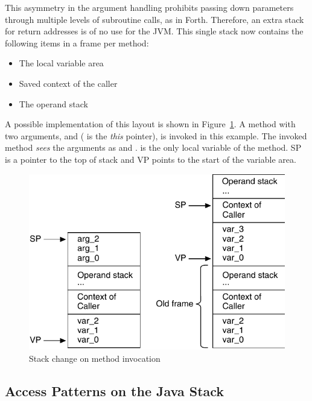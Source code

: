 This asymmetry in the argument handling prohibits passing down
parameters through multiple levels of subroutine calls, as in Forth.
Therefore, an extra stack for return addresses is of no use for the
JVM. This single stack now contains the following items in a frame
per method:
%
\begin{itemize}
\item The local variable area
\item Saved context of the caller
\item The operand stack
\end{itemize}
%
A possible implementation of this layout is shown in
Figure~\ref{fig_stack_invoke}. A method with two arguments,
 and  ( is the
\emph{this} pointer), is invoked in this example. The invoked method
\emph{sees} the arguments as  and .
 is the only local variable of the method. SP is a
pointer to the top of stack and VP points to the start of the
variable area.

\begin{figure}
    \centering
    \includegraphics[scale=\picscale]{stack/stack_invocation}
    \caption{Stack change on method invocation}
    \label{fig_stack_invoke}
\end{figure}

\subsection{Access Patterns on the Java Stack}
\label{subsec:access}

